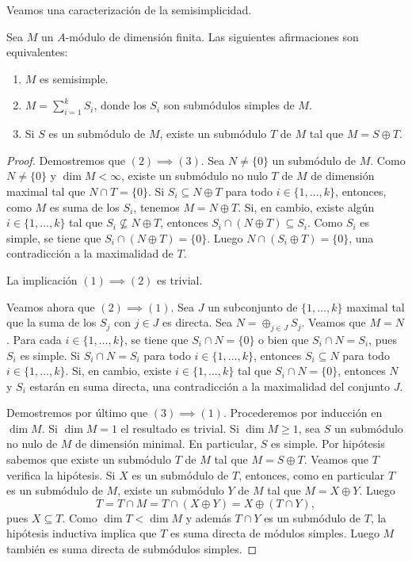 Veamos una caracterización de la semisimplicidad.
 
\begin{proposition}
\label{pro:semisimple}
	Sea $M$ un $A$-módulo de dimensión finita. Las siguientes afirmaciones son equivalentes:
	\begin{enumerate}
		\item $M$ es semisimple.
		\item $M=\sum_{i=1}^k S_i$, donde los $S_i$ son submódulos simples de $M$.
		\item Si $S$ es un submódulo de $M$, existe un submódulo $T$ de $M$ tal que $M=S\oplus T$.    
	\end{enumerate}
\end{proposition}

\begin{proof}
	Demostremos que $(2)\implies(3)$.
	Sea $N\ne\{0\}$ un submódulo de $M$. Como $N\ne\{0\}$ y $\dim M<\infty$, existe
	un submódulo no nulo $T$ de $M$ de dimensión maximal
	tal que $N\cap T=\{0\}$. Si $S_i\subseteq N\oplus T$ para todo $i\in\{1,\dots,k\}$, entonces, como $M$ es suma de los $S_i$, tenemos $M=N\oplus T$. 
	Si, en cambio, existe algún $i\in\{1,\dots,k\}$ tal que $S_i\not\subseteq N\oplus T$, entonces $S_i\cap (N\oplus T)\subseteq S_i$. Como $S_i$ es simple,
	se tiene que $S_i\cap (N\oplus T)=\{0\}$. Luego $N\cap (S_i\oplus T)=\{0\}$, una contradicción a la maximalidad de $T$.  
	
	La implicación $(1)\implies(2)$ es trivial. 
	
	Veamos ahora que $(2)\implies(1)$. Sea $J$ un subconjunto de $\{1,\dots,k\}$ maximal tal que 
	la suma de los $S_j$ con $j\in J$ es directa. Sea $N=\oplus_{j\in J}S_j$. Veamos que $M=N$. 
	Para cada $i\in\{1,\dots,k\}$, se tiene que $S_i\cap N=\{0\}$ o bien que $S_i\cap N=S_i$, pues
	$S_i$ es simple. Si $S_i\cap N=S_i$ para todo $i\in\{1,\dots,k\}$, entonces $S_i\subseteq N$ para todo $i\in\{1,\dots,k\}$.  
	Si, en cambio, existe $i\in\{1,\dots,k\}$ tal que $S_i\cap N=\{0\}$, entonces $N$ y $S_i$ estarán en suma directa, 
	una contradicción a la maximalidad del conjunto $J$.
	
	Demostremos por último que $(3)\implies(1)$. 
	Procederemos por inducción en $\dim M$. Si $\dim M=1$ el resultado es trivial. Si $\dim M\geq1$, 
	sea $S$ un submódulo no nulo de $M$ de dimensión minimal. En particular, $S$ es simple. 
	Por hipótesis sabemos que existe un submódulo $T$ de $M$ tal que $M=S\oplus T$. Veamos que $T$ verifica la hipótesis. 
	Si $X$ es un submódulo de $T$, entonces, como en particular $T$ es un submódulo de $M$, existe un submódulo $Y$ de $M$ tal que
	$M=X\oplus Y$. Luego 
	\[
	T=T\cap M=T\cap (X\oplus Y)=X\oplus (T\cap Y),
	\]
	pues $X\subseteq T$. 
	Como $\dim T<\dim M$ y además $T\cap Y$ es un submódulo de $T$, la hipótesis inductiva 
	implica que $T$ es suma directa de módulos simples. Luego $M$ también es suma
	directa de submódulos simples. 
\end{proof}

